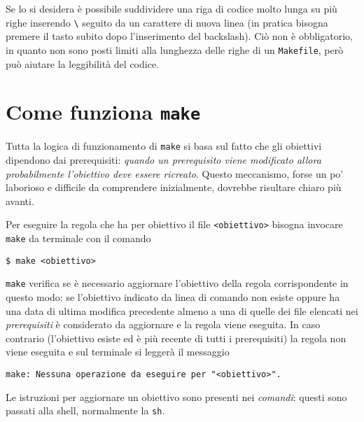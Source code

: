 Se lo si desidera è possibile suddividere una riga di codice molto lunga su più
righe inserendo \texttt{\textbackslash{}} seguito da un carattere di nuova linea
(in pratica bisogna premere il tasto  subito dopo l'inserimento del
backslash).  Ciò non è obbligatorio, in quanto non sono posti limiti alla
lunghezza delle righe di un \texttt{Makefile}, però può aiutare la leggibilità
del codice.


\section{Come funziona \texttt{make}}
\label{sec:come-funziona}

Tutta la logica di funzionamento di \texttt{make} si basa sul fatto che gli
obiettivi dipendono dai prerequisiti:
\emph{quando un prerequisito viene modificato allora probabilmente l'obiettivo
  deve essere ricreato}.
Questo meccanismo, forse un po' laborioso e difficile da comprendere
inizialmente, dovrebbe risultare chiaro più avanti.

Per eseguire la regola che ha per obiettivo il file \texttt{<obiettivo>} bisogna
invocare \texttt{make} da terminale con il comando
\begin{verbatim}
$ make <obiettivo>
\end{verbatim} %
\texttt{make} verifica se è necessario aggiornare l'obiettivo della regola
corrispondente in questo modo: se l'obiettivo indicato da linea di comando non
esiste oppure ha una data di ultima modifica precedente almeno a una di quelle
dei file elencati nei \emph{prerequisiti} è considerato da aggiornare e la
regola viene eseguita.  In caso contrario (l'obiettivo esiste ed è più recente
di tutti i prerequisiti) la regola non viene eseguita e sul terminale si leggerà
il messaggio
\begin{verbatim}
make: Nessuna operazione da eseguire per "<obiettivo>".
\end{verbatim}
Le istruzioni per aggiornare un obiettivo sono
presenti nei \emph{comandi}: questi sono passati alla shell, normalmente la
\texttt{sh}.

